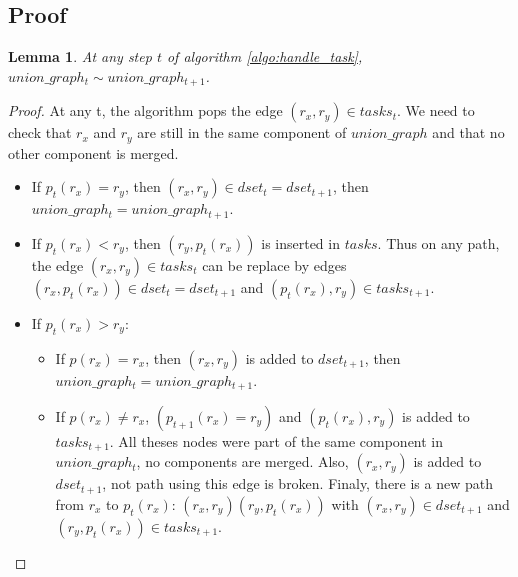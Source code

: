 \documentclass[12px]{article}
\newtheorem{lemma}{Lemma}
\begin{document}
  \subsection{Proof}
    \begin{lemma}
      At any step $t$ of algorithm \ref{algo:handle_task}, $union\_graph_t \sim union\_graph_{t+1}$.
    \end{lemma}
    \begin{proof}
      At any t, the algorithm pops the edge $(r_x, r_y) \in tasks_t$. We need to check that $r_x$ and $r_y$ are still in the same component of $union\_graph$ and that no other component is merged.
      \begin{itemize}
        \item If $p_t(r_x) = r_y$, then $(r_x, r_y) \in dset_t = dset_{t+1}$, then $union\_graph_t = union\_graph_{t+1}$.
        \item If $p_t(r_x) < r_y$, then $(r_y, p_t(r_x))$ is inserted in $tasks$. Thus on any path, the edge $(r_x, r_y) \in tasks_t$ can be replace by edges $(r_x, p_t(r_x)) \in dset_t = dset_{t+1}$ and $(p_t(r_x), r_y) \in tasks_{t+1}$.
        \item If $p_t(r_x) > r_y$:
          \begin{itemize}
            \item If $p(r_x) = r_x$, then $(r_x, r_y)$ is added to $dset_{t+1}$, then $union\_graph_t = union\_graph_{t+1}$.
            \item If $p(r_x) \neq r_x$, $(p_{t+1}(r_x) = r_y)$ and $(p_t(r_x), r_y)$ is added to $tasks_{t+1}$. All theses nodes were part of the same component in $union\_graph_t$, no components are merged. Also, $(r_x, r_y)$ is added to $dset_{t+1}$, not path using this edge is broken. Finaly, there is a new path from $r_x$ to $p_t(r_x)$: $(r_x, r_y)(r_y, p_t(r_x))$ with $(r_x, r_y) \in dset_{t+1}$ and $(r_y, p_t(r_x)) \in tasks_{t+1}$.
          \end{itemize}
      \end{itemize}
    \end{proof}
\end{document}
